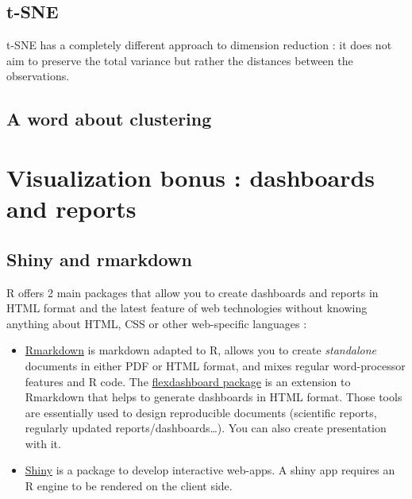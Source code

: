 \documentclass[
]{book}
\providecommand{\tightlist}{%
  \setlength{\itemsep}{0pt}\setlength{\parskip}{0pt}}
\begin{document}
\hypertarget{t-sne}{%
\subsection{t-SNE}\label{t-sne}}

t-SNE has a completely different approach to dimension reduction : it does not aim to preserve the total variance but rather the distances between the observations.

\hypertarget{a-word-about-clustering}{%
\subsection{A word about clustering}\label{a-word-about-clustering}}

\hypertarget{visualization-bonus-dashboards-and-reports}{%
\section{Visualization bonus : dashboards and reports}\label{visualization-bonus-dashboards-and-reports}}

\hypertarget{shiny-and-rmarkdown}{%
\subsection{Shiny and rmarkdown}\label{shiny-and-rmarkdown}}

R offers 2 main packages that allow you to create dashboards and reports in HTML format and the latest feature of web technologies without knowing anything about HTML, CSS or other web-specific languages :

\begin{itemize}
\tightlist
\item
  \href{https://rmarkdown.rstudio.com/}{Rmarkdown} is markdown adapted to R, allows you to create \emph{standalone} documents in either PDF or HTML format, and mixes regular word-processor features and R code. The \href{https://rmarkdown.rstudio.com/flexdashboard/}{flexdashboard package} is an extension to Rmarkdown that helps to generate dashboards in HTML format. Those tools are essentially used to design reproducible documents (scientific reports, regularly updated reports/dashboards\ldots). You can also create presentation with it.
\item
  \href{https://shiny.rstudio.com/gallery/}{Shiny} is a package to develop interactive web-apps. A shiny app requires an R engine to be rendered on the client side.
\end{itemize}
\end{document}
